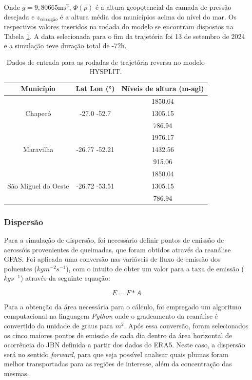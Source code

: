 	Onde $g = 9{,}80665 \text{ms}^{2}$, $\Phi(p)$ é a altura geopotencial da camada de pressão desejada e $z_{elevação}$ é a altura média dos municípios acima do nível do mar. Os respectivos valores inseridos na rodada do modelo se encontram dispostos na Tabela \ref{table:Tabela 1}. A data selecionada para o fim da trajetória foi 13 de setembro de 2024 e a simulação teve duração total de -72h.
	

	
	\begin{table}
		\begin{center}
			\begin{tabular}{ ccc } 
				\hline
				Município & Lat Lon (°) & Níveis de altura (m-agl) \\
				\hline
				\multirow{3}{4em}{Chapecó} &  & 1850.04 \\ 
				& -27.0   -52.7 & 1305.15 \\ 
				&  & 786.94 \\ 
				\hline
								\multirow{3}{4em}{Maravilha} &  & 1976.17 \\ 
				& -26.77   -52.21 & 1432.56 \\ 
				&  & 915.06 \\ 
				\hline
								\multirow{3}{4em}{São Miguel do Oeste} &  & 1850.04 \\ 
				& -26.72   -53.51 & 1305.15 \\ 
				&  & 786.94 \\ 
				\hline
			\end{tabular}
		\end{center}
		\caption{Dados de entrada para as rodadas de trajetória reversa no modelo HYSPLIT.}
		\label{table:Tabela 1}
	\end{table}
	
	\subsubsection{Dispersão}
	Para a simulação de dispersão, foi necessário definir pontos de emissão de aerossóis provenientes de queimadas, que foram obtidos através da reanálise GFAS. Foi aplicada uma conversão nas variáveis de fluxo de emissão dos poluentes ($kgm^{-2}s^{-1}$), com o intuito de obter um valor para a taxa de emissão ($kgs^{-1}$) através da seguinte equação:
	
	\begin{equation}
		E = F * A
	\end{equation}
	
	Para a obtenção da área necessária para o cálculo, foi empregado um algoritmo computacional na linguagem \textit{Python} onde o gradeamento da reanálise é convertido da unidade de graus para $m^{2}$. Após essa conversão, foram selecionados os cinco maiores pontos de emissão de cada dia dentro da área horizontal de ocorrência do JBN definida a partir dos dados do ERA5. Neste caso, a dispersão será no sentido \textit{forward}, para que seja possível analisar quais plumas foram melhor transportadas para as regiões de interesse, além da concentração das mesmas.
	
